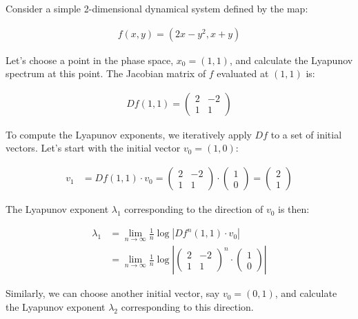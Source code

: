 \documentclass{article}
\begin{document}
Consider a simple 2-dimensional dynamical system defined by the map:

\begin{align}
    f(x, y) = (2x - y^2, x + y)
\end{align}

Let's choose a point in the phase space, $x_0 = (1, 1)$, and calculate the Lyapunov spectrum at this point. The Jacobian matrix of $f$ evaluated at $(1, 1)$ is:

\begin{align}
    Df(1, 1) = \begin{pmatrix} 2 & -2 \\ 1 & 1 \end{pmatrix}
\end{align}

To compute the Lyapunov exponents, we iteratively apply $Df$ to a set of initial vectors. Let's start with the initial vector $v_0 = (1, 0)$:

\begin{align}
    v_1 &= Df(1, 1) \cdot v_0 = \begin{pmatrix} 2 & -2 \\ 1 & 1 \end{pmatrix} \cdot \begin{pmatrix} 1 \\ 0 \end{pmatrix} = \begin{pmatrix} 2 \\ 1 \end{pmatrix}
\end{align}

The Lyapunov exponent $\lambda_1$ corresponding to the direction of $v_0$ is then:

\begin{align}
    \lambda_1 &= \lim_{n \to \infty} \frac{1}{n} \log |Df^n(1, 1) \cdot v_0| \\
    &= \lim_{n \to \infty} \frac{1}{n} \log |\begin{pmatrix} 2 & -2 \\ 1 & 1 \end{pmatrix}^n \cdot \begin{pmatrix} 1 \\ 0 \end{pmatrix}|
\end{align}

Similarly, we can choose another initial vector, say $v_0 = (0, 1)$, and calculate the Lyapunov exponent $\lambda_2$ corresponding to this direction.
\end{document}
